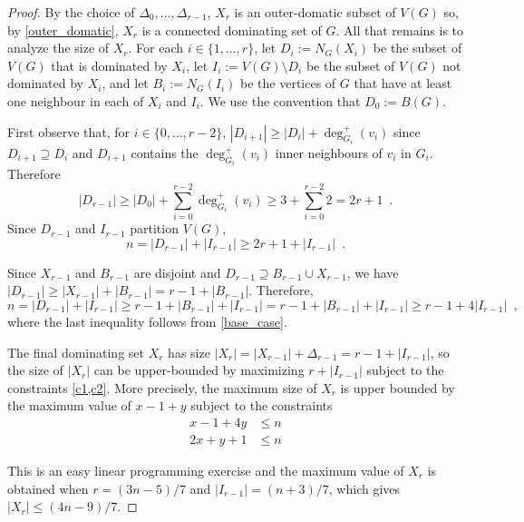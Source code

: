 \documentclass[12pt]{article}
\begin{document}
\begin{proof}
By the choice of $\Delta_0,\ldots,\Delta_{r-1}$, $X_r$ is an outer-domatic subset of $V(G)$ so, by \cref{outer_domatic}, $X_r$ is a connected dominating set of $G$.  All that remains is to analyze the size of $X_r$.  For each $i\in\{1,\ldots,r\}$, let $D_i:=N_G(X_i)$ be the subset of $V(G)$ that is dominated by $X_i$, let $I_i:=V(G)\setminus D_i$ be the subset of $V(G)$ not dominated by $X_i$, and let $B_i:=N_G(I_i)$ be the vertices of $G$ that have at least one neighbour in each of $X_i$ and $I_i$.  We use the convention that $D_0:=B(G)$.

First observe that, for $i\in\{0,\ldots,r-2\}$, $|D_{i+1}|\ge |D_i|+\deg_{G_i}^+(v_i)$ since $D_{i+1}\supseteq D_i$ and $D_{i+1}$ contains the $\deg_{G_i}^+(v_i)$ inner neighbours of $v_i$ in $G_i$.  Therefore
\[
    |D_{r-1}| \ge |D_0| + \sum_{i=0}^{r-2} \deg_{G_i}^+(v_i) \ge 3 + \sum_{i=0}^{r-2} 2 =  2r+1 \enspace . \label{double_d}
\]
Since $D_{r-1}$ and $I_{r-1}$ partition $V(G)$,
\begin{equation}
  n = |D_{r-1}| + |I_{r-1}| \ge 2r+1 + |I_{r-1}|  \enspace . \label{c1}
\end{equation}

Since $X_{r-1}$ and $B_{r-1}$ are disjoint and $D_{r-1}\supseteq B_{r-1}\cup X_{r-1}$, we have $|D_{r-1}|\ge |X_{r-1}| + |B_{r-1}|=r-1+|B_{r-1}|$.  Therefore,
\begin{equation}
    n = |D_{r-1}| + |I_{r-1}| \ge r-1 + |B_{r-1}| + |I_{r-1}| = r-1 + |B_{r-1}| + |I_{r-1}|
    \ge r - 1 + 4|I_{r-1}| \enspace , \label{c2}
\end{equation}
where the last inequality follows from \cref{base_case}.

The final dominating set $X_r$ has size $|X_r| = |X_{r-1}| + \Delta_{r-1} = r - 1 +|I_{r-1}|$, so the size of $|X_r|$ can be upper-bounded by maximizing $r+|I_{r-1}|$ subject to the constraints \cref{c1,c2}.  More precisely, the maximum size of $X_r$ is upper bounded by the maximum value of $x-1+y$ subject to the constraints
\begin{align*}
  x - 1 + 4y & \le n \\
  2x + y +1 & \le n
\end{align*}

This is an easy linear programming exercise and the maximum value of $X_{r}$ is obtained when $r=(3n-5)/7$ and $|I_{r-1}|=(n+3)/7$, which gives
$|X_r| \le (4n-9)/7$.
\end{proof}
\end{document}
